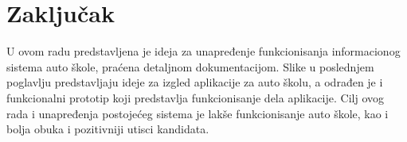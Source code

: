 \section{Zaključak}
\label{sec:zakljucak}
U ovom radu predstavljena je ideja za unapređenje funkcionisanja informacionog sistema auto škole, 
praćena detaljnom dokumentacijom. 
Slike u poslednjem poglavlju predstavljaju ideje za izgled aplikacije za auto školu, 
a odrađen je i funkcionalni prototip koji predstavlja funkcionisanje dela aplikacije.
 Cilj ovog rada i unapređenja postojećeg sistema je lakše funkcionisanje auto škole, kao i bolja obuka i pozitivniji utisci kandidata.
